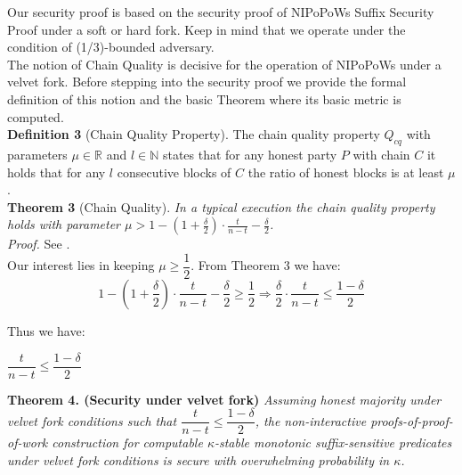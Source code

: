 Our security proof is based on the security proof of NIPoPoWs Suffix Security Proof under a soft or hard fork. Keep in mind that we operate under the condition of (1/3)-bounded adversary.\\

The notion of Chain Quality is decisive for the operation of NIPoPoWs under a velvet fork. Before stepping into the security proof we provide the formal definition of this notion and the basic Theorem where its basic metric is computed.\\

\textbf{Definition 3 }(Chain Quality Property)\cite{Backbone}. The chain quality property $Q_{cq}$ with parameters $\mu \in \mathbb{R}$ and $l \in \mathbb{N}$ states that for any honest party $P$ with chain $C$ it holds that for any $l $ consecutive blocks of $C$ the ratio of honest blocks is at least $\mu$.\\

\textbf{Theorem 3 }(Chain Quality)\cite{Backbone}. \textit{In a typical execution the chain quality property holds with parameter $\mu > 1 - (1 + \frac{\delta}{2}) \cdot \frac{t}{n-t} - \frac{\delta}{2}$.}\\
\textit{Proof.} See \cite{Backbone}.\\

Our interest lies in keeping $\mu \geq \dfrac{1}{2}$.
From Theorem 3 we have:
\begin{equation*}
1 - (1 + \frac{\delta}{2}) \cdot \frac{t}{n-t} - \frac{\delta}{2} \geq \dfrac{1}{2} \Rightarrow 
\frac{\delta}{2} \cdot \frac{t}{n-t} \leq \frac{1-\delta}{2}
\end{equation*}

Thus we have:
\begin{center}
$  \dfrac{t}{n-t} \leq \dfrac{1-\delta}{2} $
\end{center}

\textbf{Theorem 4. (Security under velvet fork)} \textit{Assuming honest majority under velvet fork conditions such that $\dfrac{t}{n-t} \leq \dfrac{1-\delta}{2}$, the non-interactive proofs-of-proof-of-work construction for computable $\kappa$-stable monotonic suffix-sensitive predicates under velvet fork conditions is secure with overwhelming probability in $\kappa$.}\\

